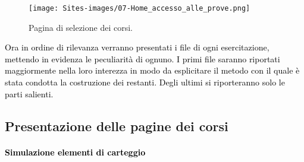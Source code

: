 \begin{figure}[H]
	\begin{center}
		\texttt{[image: Sites-images/07-Home\_accesso\_alle\_prove.png]}
		\caption{Pagina di selezione dei corsi.}
	\end{center}
\end{figure}

\raggedright
\textcolor{black}{Ora in ordine di rilevanza verranno presentati i file di ogni esercitazione, mettendo in evidenza le peculiarità di ognuno. I primi file saranno riportati maggiormente nella loro interezza in modo da esplicitare il metodo con il quale è stata condotta la costruzione dei restanti. Degli ultimi si riporteranno solo le parti salienti.}\\

\subsection{Presentazione delle pagine dei corsi}

\paragraph{\textcolor{black}{Simulazione elementi di carteggio}}\leavevmode\\


